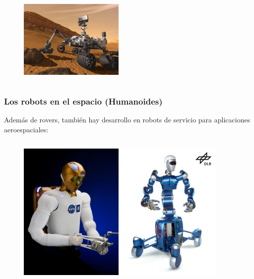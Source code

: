 \documentclass[10pt,spanish,aspectratio=1610]{beamer}
\begin{document}
\begin{frame}
\begin{columns}
\begin{column}{0.5\textwidth}
\begin{figure}
        \includegraphics[width=0.45\textwidth]{Figures/RoverCuriosity.jpg}
      \end{figure}
    \end{column}
  \end{columns}
\end{frame}

\begin{frame}\frametitle{Los robots en el espacio (Humanoides)}
  Además de rovers, también hay desarrollo en robots de servicio para aplicaciones aeroespaciales\cite{bogue2012robots}:
  \begin{columns}
    \begin{column}{0.5\textwidth}
      \begin{figure}
        \centering
        \includegraphics[width=0.45\textwidth]{Figures/RobotRobonaut.jpg}
        \includegraphics[width=0.45\textwidth]{Figures/RobotJustin.jpg}

\end{figure}
\end{column}
\end{columns}
\end{frame}
\end{document}
